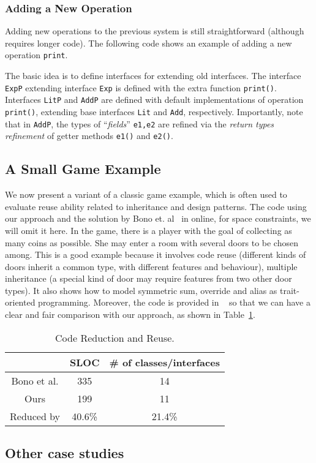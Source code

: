 

\subsubsection{Adding a New Operation}
Adding new operations to the previous system is still straightforward (although
requires longer code). The following code shows an example of adding a new
operation \texttt{print}. 


The basic idea is to define interfaces for extending old interfaces.  The
interface \texttt{ExpP} extending interface \texttt{Exp} is defined with the
extra function \texttt{print()}. Interfaces \texttt{LitP} and \texttt{AddP} are
defined with default implementations of operation \texttt{print()}, extending
base interfaces \texttt{Lit} and \texttt{Add}, respectively. Importantly, note
that in \texttt{AddP}, the types of ``\emph{fields}'' \texttt{e1,e2} are refined via
the \emph{return types refinement} of getter methods \texttt{e1()} and
\texttt{e2()}. 


\subsection{A Small Game Example}
We now present a variant of a classic game example, which is often used to
evaluate reuse ability related to inheritance and design patterns. The code
using our approach and the solution by Bono et. al~\cite{bono14} in online, for
space constraints, we will omit it here. In the game, there is a player with the
goal of collecting as many coins as possible. She may enter a room with several
doors to be chosen among. This is a good example because it involves code reuse
(different kinds of doors inherit a common type, with different features and
behaviour), multiple inheritance (a special kind of door may require features
from two other door types). It also shows how to model symmetric sum, override
and alias as trait-oriented programming. Moreover, the code is provided in
~\cite{bono14} so that we can have a clear and fair comparison with our
approach, as shown in Table~\ref{table:codereduction}.

\begin{table}[h]
\centering
\begin{tabular}{ccc}
\hline
            & SLOC   & \# of classes/interfaces \\ \hline
Bono et al. & 335    & 14                       \\
Ours        & 199    & 11                       \\
\rowcolor[HTML]{C0C0C0} 
Reduced by  & 40.6\% & 21.4\%                   \\ \hline
\end{tabular}
\caption{Code Reduction and Reuse.}
\label{table:codereduction}
\end{table}


\subsection{Other case studies}
